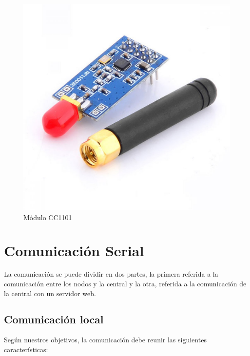 \begin{figure}[htb]
	\centering
	\includegraphics[scale=0.2]{images/modulo_cc1101.jpg}
    \caption{Módulo CC1101}
	\label{fig:module_cc1101}
\end{figure}

\section{Comunicación Serial}

La comunicación se puede dividir en dos partes, la primera referida a la comunicación entre los nodos y la central y la otra, referida a la comunicación
de la central con un servidor web.
\subsection{Comunicación local}

Según nuestros objetivos, la comunicación debe reunir las siguientes características:

